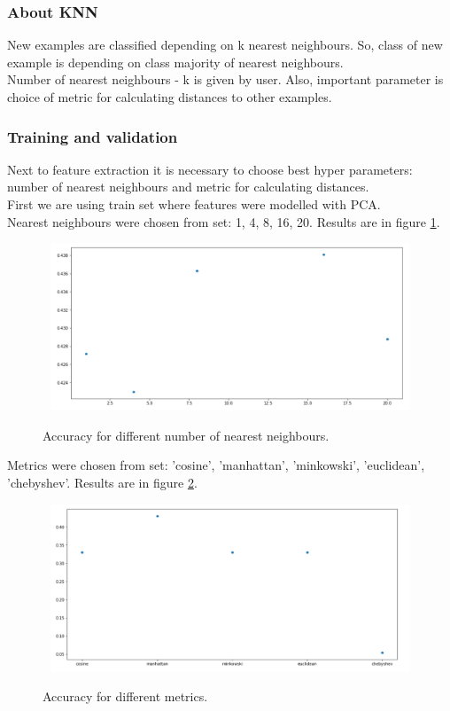 \documentclass{article}
\begin{document}
\subsubsection{About KNN}
New examples are classified depending on k nearest neighbours. So, class of new example is depending on class 
majority of nearest neighbours. \\
Number of nearest neighbours - k is given by user. Also, important parameter is choice of metric for calculating
distances to other examples. \\

\subsubsection{Training and validation}
Next to feature extraction it is necessary to choose best hyper parameters: number of nearest neighbours and metric
for calculating distances.\\
First we are using train set where features were modelled with PCA.\\
Nearest neighbours were chosen from set: {1, 4, 8, 16, 20}. Results are in figure \ref{fig:knnNN1}.\\

\begin{figure}[!htb]
\includegraphics[width=12cm, height=5cm]{knnNN1}\\
\caption{Accuracy for different number of nearest neighbours.}
\label{fig:knnNN1}
\centering
\end{figure}


Metrics were chosen from set: {'cosine', 'manhattan', 'minkowski', 'euclidean', 'chebyshev'}. Results are in figure \ref{fig:knnmet1}.\\

\begin{figure}[!htb]
\includegraphics[width=12cm, height=5cm]{knnMet1}\\
\caption{Accuracy for different metrics.}
\label{fig:knnmet1}
\centering
\end{figure}
\end{document}
